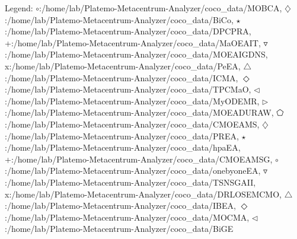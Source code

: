 Legend: {\color{CornflowerBlue}$\circ$}:/home/lab/Platemo-Metacentrum-Analyzer/coco\_data/MOBCA, {{}$\diamondsuit$}:/home/lab/Platemo-Metacentrum-Analyzer/coco\_data/BiCo, {\color{Green}$\star$}:/home/lab/Platemo-Metacentrum-Analyzer/coco\_data/DPCPRA, {\color{red}+}:/home/lab/Platemo-Metacentrum-Analyzer/coco\_data/MaOEAIT, {\color{brown}$\triangledown$}:/home/lab/Platemo-Metacentrum-Analyzer/coco\_data/MOEAIGDNS, {{}x}:/home/lab/Platemo-Metacentrum-Analyzer/coco\_data/PeEA, {{}$\triangle$}:/home/lab/Platemo-Metacentrum-Analyzer/coco\_data/ICMA, {{}$\Diamond$}:/home/lab/Platemo-Metacentrum-Analyzer/coco\_data/TPCMaO, {{}$\triangleleft$}:/home/lab/Platemo-Metacentrum-Analyzer/coco\_data/MyODEMR, {{}$\triangleright$}:/home/lab/Platemo-Metacentrum-Analyzer/coco\_data/MOEADURAW, {{}$\pentagon$}:/home/lab/Platemo-Metacentrum-Analyzer/coco\_data/CMOEAMS, {{}$\diamondsuit$}:/home/lab/Platemo-Metacentrum-Analyzer/coco\_data/PREA, {{}$\star$}:/home/lab/Platemo-Metacentrum-Analyzer/coco\_data/hpaEA, {{}+}:/home/lab/Platemo-Metacentrum-Analyzer/coco\_data/CMOEAMSG, {{}$\circ$}:/home/lab/Platemo-Metacentrum-Analyzer/coco\_data/onebyoneEA, {{}$\triangledown$}:/home/lab/Platemo-Metacentrum-Analyzer/coco\_data/TSNSGAII, {{}x}:/home/lab/Platemo-Metacentrum-Analyzer/coco\_data/DRLOSEMCMO, {{}$\triangle$}:/home/lab/Platemo-Metacentrum-Analyzer/coco\_data/IBEA, {{}$\Diamond$}:/home/lab/Platemo-Metacentrum-Analyzer/coco\_data/MOCMA, {{}$\triangleleft$}:/home/lab/Platemo-Metacentrum-Analyzer/coco\_data/BiGE